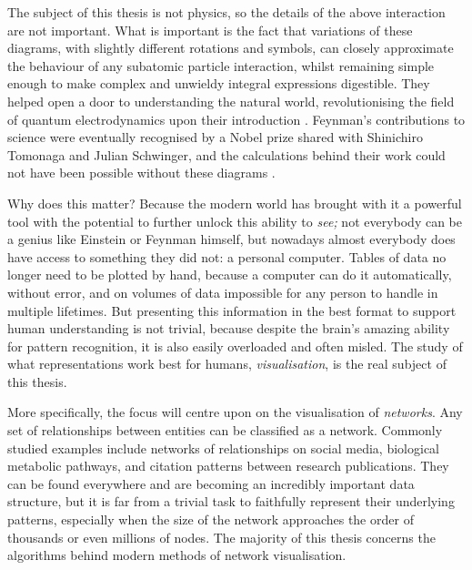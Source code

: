 The subject of this thesis is not physics, so the details of the above interaction are not important. What is important is the fact that variations of these diagrams, with slightly different rotations and symbols, can closely approximate the behaviour of any subatomic particle interaction, whilst remaining simple enough to make complex and unwieldy integral expressions digestible. They helped open a door to understanding the natural world, revolutionising the field of quantum electrodynamics upon their introduction \cite{Kaiser2005}.
Feynman's contributions to science were eventually recognised by a Nobel prize shared with Shinichiro Tomonaga and Julian Schwinger, and the calculations behind their work could not have been possible without these diagrams \cite{Kaiser2009}.

Why does this matter? Because the modern world has brought with it a powerful tool with the potential to further unlock this ability to \emph{see;}
not everybody can be a genius like Einstein or Feynman himself, but nowadays almost everybody does have access to something they did not: a personal computer.
Tables of data no longer need to be plotted by hand, because a computer can do it automatically, without error, and on volumes of data impossible for any person to handle in multiple lifetimes.
But presenting this information in the best format to support human understanding is not trivial, because despite the brain's amazing ability for pattern recognition, it is also easily overloaded and often misled.
The study of what representations work best for humans, \emph{visualisation}, is the real subject of this thesis.

More specifically, the focus will centre upon on the visualisation of \emph{networks}. 
Any set of relationships between entities can be classified as a network. Commonly studied examples include networks of relationships on social media, biological metabolic pathways, and citation patterns between research publications. They can be found everywhere and are becoming an incredibly important data structure, but it is far from a trivial task to faithfully represent their underlying patterns, especially when the size of the network approaches the order of thousands or even millions of nodes. The majority of this thesis concerns the algorithms behind modern methods of network visualisation.

